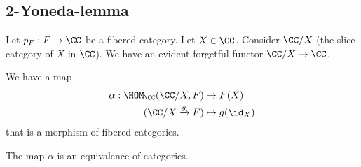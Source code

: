 \documentclass[11pt, english]{article}
\begin{document}
\subsection{2-Yoneda-lemma}

Let $p_F:F \to \CC$ be a fibered category. Let $X \in \CC$. Consider $\CC/X$ (the slice category of $X$ in $\CC$). We have an evident forgetful functor $\CC/X \to \CC$.

We have a map
\begin{align*}
\alpha:\HOM_\CC(\CC/X, F) &\to F(X) \\
(\CC/X \xrightarrow{g} F) &\mapsto g(\id_X)
\end{align*}
that is a morphism of fibered categories.

\begin{lemma}[2-Yoneda] The map $\alpha$ is an equivalence of categories.
\end{lemma}
\end{document}
